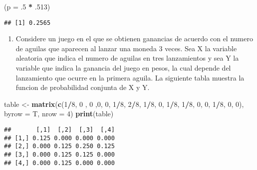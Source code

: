 \documentclass[
]{article}
\newenvironment{Shaded}{\begin{snugshade}}{\end{snugshade}}
\newcommand{\AttributeTok}[1]{\textcolor[rgb]{0.13,0.29,0.53}{#1}}
\newcommand{\DecValTok}[1]{\textcolor[rgb]{0.00,0.00,0.81}{#1}}
\newcommand{\FunctionTok}[1]{\textcolor[rgb]{0.13,0.29,0.53}{\textbf{#1}}}
\newcommand{\NormalTok}[1]{#1}
\newcommand{\OtherTok}[1]{\textcolor[rgb]{0.56,0.35,0.01}{#1}}
\newcommand{\SpecialCharTok}[1]{\textcolor[rgb]{0.81,0.36,0.00}{\textbf{#1}}}
\providecommand{\tightlist}{%
  \setlength{\itemsep}{0pt}\setlength{\parskip}{0pt}}
\begin{document}
\begin{Shaded}
\begin{Highlighting}[]
\NormalTok{(}\AttributeTok{p =}\NormalTok{ .}\DecValTok{5} \SpecialCharTok{*}\NormalTok{ .}\DecValTok{513}\NormalTok{)}
\end{Highlighting}
\end{Shaded}

\begin{verbatim}
## [1] 0.2565
\end{verbatim}

\begin{enumerate}
\def\labelenumi{\arabic{enumi}.}
\setcounter{enumi}{3}
\tightlist
\item
  Considere un juego en el que se obtienen ganancias de acuerdo con el
  numero de aguilas que aparecen al lanzar una moneda 3 veces. Sea X la
  variable aleatoria que indica el numero de aguilas en tres
  lanzamientos y sea Y la variable que indica la ganancia del juego en
  pesos, la cual depende del lanzamiento que ocurre en la primera
  aguila. La siguiente tabla muestra la funcion de probabilidad conjunta
  de X y Y.
\end{enumerate}

\begin{Shaded}
\begin{Highlighting}[]
\NormalTok{table }\OtherTok{\textless{}{-}} \FunctionTok{matrix}\NormalTok{(}\FunctionTok{c}\NormalTok{(}\DecValTok{1}\SpecialCharTok{/}\DecValTok{8}\NormalTok{, }\DecValTok{0}\NormalTok{ , }\DecValTok{0}\NormalTok{ ,}\DecValTok{0}\NormalTok{, }\DecValTok{0}\NormalTok{, }\DecValTok{1}\SpecialCharTok{/}\DecValTok{8}\NormalTok{, }\DecValTok{2}\SpecialCharTok{/}\DecValTok{8}\NormalTok{, }\DecValTok{1}\SpecialCharTok{/}\DecValTok{8}\NormalTok{, }\DecValTok{0}\NormalTok{, }\DecValTok{1}\SpecialCharTok{/}\DecValTok{8}\NormalTok{, }\DecValTok{1}\SpecialCharTok{/}\DecValTok{8}\NormalTok{, }\DecValTok{0}\NormalTok{, }\DecValTok{0}\NormalTok{, }\DecValTok{1}\SpecialCharTok{/}\DecValTok{8}\NormalTok{, }\DecValTok{0}\NormalTok{, }\DecValTok{0}\NormalTok{), }\AttributeTok{byrow =}\NormalTok{ T, }\AttributeTok{nrow =} \DecValTok{4}\NormalTok{)}
\FunctionTok{print}\NormalTok{(table)}
\end{Highlighting}
\end{Shaded}

\begin{verbatim}
##       [,1]  [,2]  [,3]  [,4]
## [1,] 0.125 0.000 0.000 0.000
## [2,] 0.000 0.125 0.250 0.125
## [3,] 0.000 0.125 0.125 0.000
## [4,] 0.000 0.125 0.000 0.000
\end{verbatim}
\end{document}
